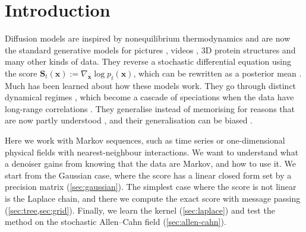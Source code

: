 \section{Introduction}
\label{sec:intro}

Diffusion models are inspired by nonequilibrium thermodynamics \cite{sohl2015deep} and are now the standard generative
models for pictures \cite{rombach2022latent,betker2023dalle3}, videos \cite{veo3}, 3D protein structures
\cite{abramson2024alphafold3} and many other kinds of data. They reverse a stochastic differential equation
\cite{anderson1982reverse,ho2020denoising,song2021scorebased} using the score
$\mathbf S_t(\mathbf x)
    := \nabla_{\mathbf x}\log p_t(\mathbf x)$, which can be rewritten as a posterior mean
\cite{robbins1956empirical,vincent2011connection,efron2011tweedie}. Much has been learned about how these models work.
They go through distinct dynamical regimes \cite{biroli2023generative,biroli2024dynamical,achilli2026speciation}, which
become a cascade of speciations when the data have long-range correlations \cite{garnierbrun2026foam}. They generalise
instead of memorising for reasons that are now partly understood
\cite{kadkhodaie2024generalization,achilli2025memorization,bonnaire2025memorize}, and their generalisation can be biased
\cite{garnierbrun2026biased}.

Here we work with Markov sequences, such as time series or one-dimensional physical fields with nearest-neighbour
interactions. We want to understand what a denoiser gains from knowing that the data are Markov, and how to use it. We
start from the Gaussian case, where the score has a linear closed form set by a precision matrix (\cref{sec:gaussian}).
The simplest case where the score is not linear is the Laplace chain, and there we compute the exact score with message
passing \cite{pearl1988probabilistic,mezard2002analytic,mezard2003passing,mezard2009information}
(\cref{sec:tree,sec:grid}). Finally, we learn the kernel (\cref{sec:laplace}) and test the method on the stochastic
Allen--Cahn field \cite{allen1979microscopic} (\cref{sec:allen-cahn}).


